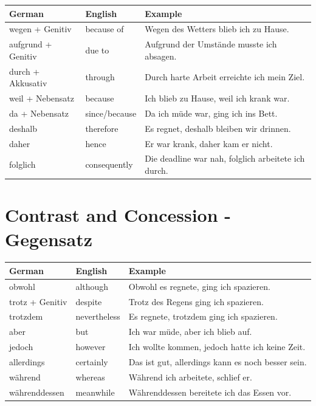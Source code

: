 \begin{center}
\begin{tabular}{|l|p{7cm}|p{5cm}|}
\hline
German & English & Example \\ \hline
wegen + Genitiv & because of & Wegen des Wetters blieb ich zu Hause. \\ \hline
aufgrund + Genitiv & due to & Aufgrund der Umstände musste ich absagen. \\ \hline
durch + Akkusativ & through & Durch harte Arbeit erreichte ich mein Ziel. \\ \hline
weil + Nebensatz & because & Ich blieb zu Hause, weil ich krank war. \\ \hline
da + Nebensatz & since/because & Da ich müde war, ging ich ins Bett. \\ \hline
deshalb & therefore & Es regnet, deshalb bleiben wir drinnen. \\ \hline
daher & hence & Er war krank, daher kam er nicht. \\ \hline
folglich & consequently & Die deadline war nah, folglich arbeitete ich durch. \\ \hline
\end{tabular}
\end{center}

\section{Contrast and Concession - Gegensatz}
\label{sec:Gegensatz}

\begin{center}
\begin{tabular}{|l|p{7cm}|p{5cm}|}
\hline
German & English & Example \\ \hline
obwohl & although & Obwohl es regnete, ging ich spazieren. \\ \hline
trotz + Genitiv & despite & Trotz des Regens ging ich spazieren. \\ \hline
trotzdem & nevertheless & Es regnete, trotzdem ging ich spazieren. \\ \hline
aber & but & Ich war müde, aber ich blieb auf. \\ \hline
jedoch & however & Ich wollte kommen, jedoch hatte ich keine Zeit. \\ \hline
allerdings & certainly & Das ist gut, allerdings kann es noch besser sein. \\ \hline
während & whereas & Während ich arbeitete, schlief er. \\ \hline
währenddessen & meanwhile & Währenddessen bereitete ich das Essen vor. \\ \hline
\end{tabular}
\end{center}

